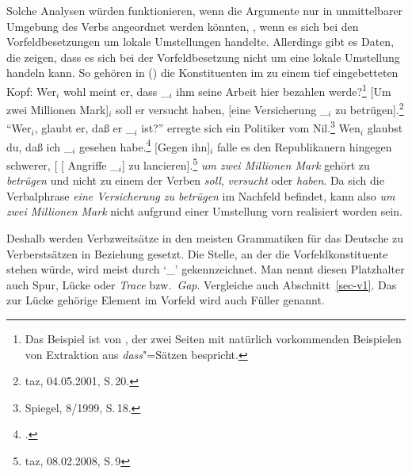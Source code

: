 Solche Analysen würden funktionieren, wenn die Argumente nur in unmittelbarer Umgebung des Verbs angeordnet
werden könnten, \dash, wenn es sich bei den Vorfeldbesetzungen um lokale Umstellungen handelte.
Allerdings gibt es Daten, die zeigen, dass es sich bei der Vorfeldbesetzung nicht um eine lokale Umstellung handeln kann.
So gehören in () die Konstituenten im \vf zu einem tief eingebetteten Kopf:
\eal
\ex 
Wer$_i$ wohl    meint   er, dass \_$_i$ ihm seine Arbeit hier bezahlen werde?\footnote{
Das Beispiel ist von \citet[]{Paul1919a}, der zwei Seiten mit natürlich vorkommenden
Beispielen von Extraktion aus \emph{dass}"=Sätzen bespricht.
}
\ex\label{bsp-um-zwei-millionen}
{}[Um zwei Millionen Mark]$_i$ soll er versucht haben, [eine Versicherung \_$_i$ zu betrügen].\footnote{
         taz, 04.05.2001, S.\,20.
}
\ex
"`Wer$_i$, glaubt er, daß er \_$_i$ ist?"' erregte sich ein Politiker vom Nil.\footnote{
        Spiegel, 8/1999, S.\,18.
}
\ex Wen$_i$ glaubst du, daß ich \_$_i$ gesehen habe.\footnote{
    .
    }
\ex
\label{bsp-gegen-ihn}
{}[Gegen ihn]$_i$ falle es den Republikanern hingegen schwerer, [ [ Angriffe \_$_i$] zu lancieren].\footnote{
  taz, 08.02.2008, S.\,9
}
\zl
\emph{um zwei Millionen Mark} gehört zu \emph{betrügen} und nicht zu einem der Verben \emph{soll}, \emph{versucht}
oder \emph{haben}. Da sich die Verbalphrase \emph{eine Versicherung zu betrügen} im Nachfeld befindet, kann
also \emph{um zwei Millionen Mark} nicht aufgrund einer Umstellung vorn realisiert worden sein.

Deshalb werden Verbzweitsätze in den meisten Grammatiken für das Deutsche zu Verberstsätzen in Beziehung gesetzt.
Die Stelle, an der die Vorfeldkonstituente stehen würde, wird meist durch `\_' gekennzeichnet. Man nennt
diesen Platzhalter auch Spur, Lücke oder \emph{Trace} bzw.\ \emph{Gap}.
Vergleiche auch Abschnitt~\ref{sec-v1}. Das zur Lücke gehörige Element im Vorfeld wird auch Füller genannt.

